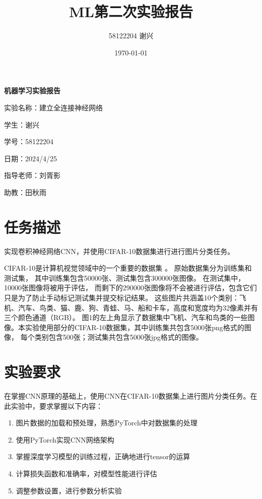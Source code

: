 \documentclass[12pt]{article}
\title{\textbf{ML第二次实验报告}}
\author{58122204 谢兴}
\date{\today}
\begin{document}
\begin{titlepage}
  \centering
  \vspace*{60pt}
  \Huge\textbf{机器学习实验报告}

  \vspace{100pt}
  \Large
  实验名称：建立全连接神经网络

  \vspace{25pt}
  学生：谢兴

  \vspace{25pt}
  学号：58122204

  \vspace{25pt}
  日期：2024/4/25

  \vspace{25pt}
  指导老师：刘胥影

  \vspace{25pt}
  助教：田秋雨



\end{titlepage}


\newpage
\tableofcontents


\section{任务描述}
实现卷积神经网络CNN，并使用CIFAR-10数据集进行进行图片分类任务。

CIFAR-10是计算机视觉领域中的一个重要的数据集 。 原始数据集分为训练集和测试集，
其中训练集包含50000张、测试集包含300000张图像。 在测试集中，10000张图像将被用于评估，
而剩下的290000张图像将不会被进行评估，包含它们只是为了防止手动标记测试集并提交标记结果。
这些图片共涵盖10个类别：飞机、汽车、鸟类、猫、鹿、狗、青蛙、马、船和卡车，高度和宽度均为32像素并有三个颜色通道（RGB）。
图1的左上角显示了数据集中飞机、汽车和鸟类的一些图像。本实验使用部分的CIFAR-10数据集，其中训练集共包含5000张png格式的图像，
每个类别包含500张；测试集共包含5000张jpg格式的图像。


\section{实验要求}

在掌握CNN原理的基础上，使用CNN在CIFAR-10数据集上进行图片分类任务。在此实验中，要求掌握以下内容：

\begin{enumerate}
  \item 图片数据的加载和预处理，熟悉PyTorch中对数据集的处理
  \item 使用PyTorch实现CNN网络架构
  \item 掌握深度学习模型的训练过程，正确地进行tensor的运算
  \item 计算损失函数和准确率，对模型性能进行评估
  \item 调整参数设置，进行参数分析实验
\end{enumerate}
\end{document}
